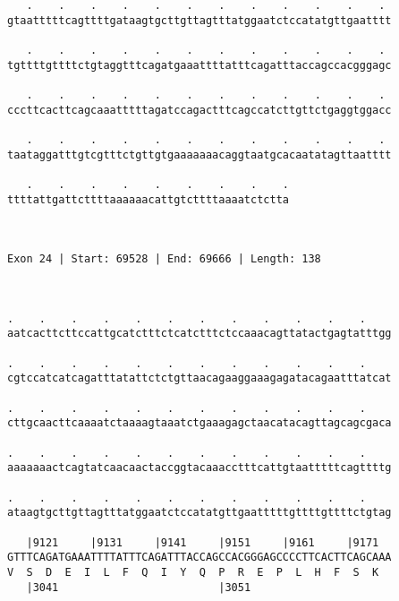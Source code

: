 \documentclass{article}
\begin{document}
\begin{Verbatim}
   .    .    .    .    .    .    .    .    .    .    .    . 
gtaatttttcagttttgataagtgcttgttagtttatggaatctccatatgttgaatttt
                                                            
   .    .    .    .    .    .    .    .    .    .    .    . 
tgttttgttttctgtaggtttcagatgaaattttatttcagatttaccagccacgggagc
                                                            
   .    .    .    .    .    .    .    .    .    .    .    . 
cccttcacttcagcaaatttttagatccagactttcagccatcttgttctgaggtggacc
                                                            
   .    .    .    .    .    .    .    .    .    .    .    . 
taataggatttgtcgtttctgttgtgaaaaaaacaggtaatgcacaatatagttaatttt
                                                            
   .    .    .    .    .    .    .    .    .
ttttattgattcttttaaaaaacattgtcttttaaaatctctta
                                            
                                            
 
Exon 24 | Start: 69528 | End: 69666 | Length: 138



.    .    .    .    .    .    .    .    .    .    .    .    
aatcacttcttccattgcatctttctcatctttctccaaacagttatactgagtatttgg
                                                            
.    .    .    .    .    .    .    .    .    .    .    .    
cgtccatcatcagatttatattctctgttaacagaaggaaagagatacagaatttatcat
                                                            
.    .    .    .    .    .    .    .    .    .    .    .    
cttgcaacttcaaaatctaaaagtaaatctgaaagagctaacatacagttagcagcgaca
                                                            
.    .    .    .    .    .    .    .    .    .    .    .    
aaaaaaactcagtatcaacaactaccggtacaaacctttcattgtaatttttcagttttg
                                                            
.    .    .    .    .    .    .    .    .    .    .    .    
ataagtgcttgttagtttatggaatctccatatgttgaatttttgttttgttttctgtag
                                                            
   |9121     |9131     |9141     |9151     |9161     |9171  
GTTTCAGATGAAATTTTATTTCAGATTTACCAGCCACGGGAGCCCCTTCACTTCAGCAAA
V  S  D  E  I  L  F  Q  I  Y  Q  P  R  E  P  L  H  F  S  K  
   |3041                         |3051                      
  

\end{Verbatim}
\end{document}
